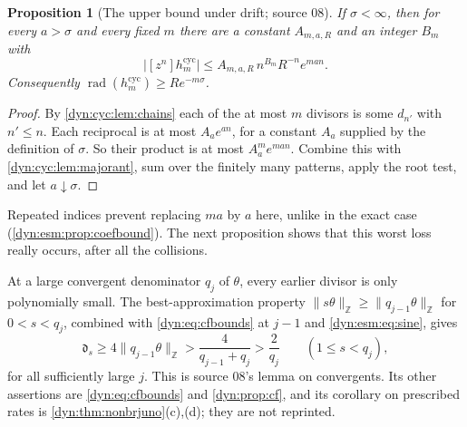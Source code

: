 \documentclass[11pt,letterpaper]{article}
\newtheorem{proposition}[proposition]{Proposition}
\theoremstyle{definition}
\theoremstyle{remark}
\newcommand{\Z}{\mathbb Z}
\newcommand{\rad}{\operatorname{rad}}
\numberwithin{equation}{section}
\begin{document}
\begin{proposition}[The upper bound under drift; source 08]
\label{dyn:cyc:prop:upper}
If $\sigma<\infty$, then for every $a>\sigma$ and every fixed $m$ there are a
constant $A_{m,a,R}$ and an integer $B_m$ with
\begin{equation}\label{dyn:cyc:eq:upper}
 \bigl|[z^{n}]h^{\mathrm{cyc}}_m\bigr|\le A_{m,a,R}\,n^{B_m}R^{-n}e^{man}.
\end{equation}
Consequently $\rad(h^{\mathrm{cyc}}_m)\ge Re^{-m\sigma}$.
\end{proposition}
\begin{proof}
By \cref{dyn:cyc:lem:chains} each of the at most $m$ divisors is some
$d_{n'}$ with $n'\le n$. Each reciprocal is at most $A_ae^{an}$, for a
constant $A_a$ supplied by the definition of $\sigma$. So their product is
at most $A_a^{m}e^{man}$. Combine this with \cref{dyn:cyc:lem:majorant},
sum over the finitely many patterns, apply the root test, and let
$a\downarrow\sigma$.
\end{proof}

Repeated indices prevent replacing $ma$ by $a$ here, unlike in the exact
case (\cref{dyn:esm:prop:coefbound}). The next proposition shows that this
worst loss really occurs, after all the collisions.

At a large convergent denominator $q_j$ of $\theta$, every earlier divisor
is only polynomially small. The best-approximation property
$\|s\theta\|_{\Z}\ge\|q_{j-1}\theta\|_{\Z}$ for $0<s<q_j$, combined with
\eqref{dyn:eq:cfbounds} at $j-1$ and \eqref{dyn:esm:eq:sine}, gives
\cite{Marmi,CarminatiMarmi}
\begin{equation}\label{dyn:cyc:eq:earlier}
 \mathfrak d_s\ge4\|q_{j-1}\theta\|_{\Z}>\frac4{q_{j-1}+q_j}>\frac2{q_j}
 \qquad(1\le s<q_j),
\end{equation}
for all sufficiently large $j$. This is source 08's lemma on convergents. Its
other assertions are \eqref{dyn:eq:cfbounds} and \cref{dyn:prop:cf}, and its
corollary on prescribed rates is \cref{dyn:thm:nonbrjuno}(c),(d); they are
not reprinted.
\end{document}
